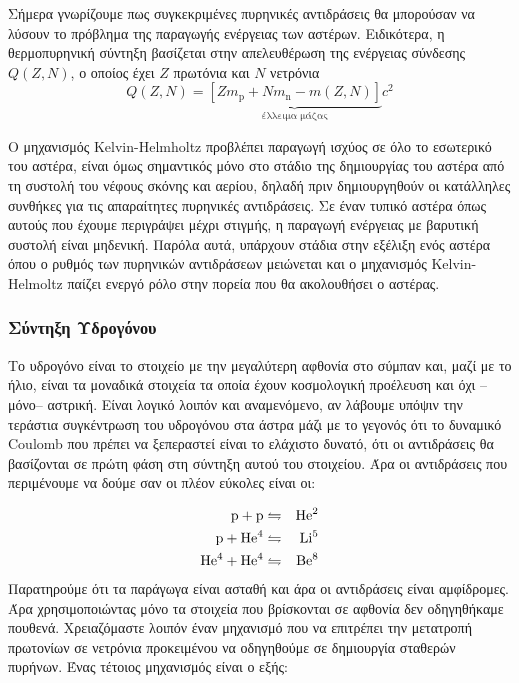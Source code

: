 Σήμερα γνωρίζουμε πως συγκεκριμένες πυρηνικές αντιδράσεις θα μπορούσαν να λύσουν το πρόβλημα της παραγωγής ενέργειας των αστέρων. Ειδικότερα, η θερμοπυρηνική σύντηξη βασίζεται στην απελευθέρωση της ενέργειας σύνδεσης $Q(Z, N)$, ο οποίος έχει $Z$ πρωτόνια και $N$ νετρόνια
\begin{equation}
    \label{eq:binding_energy}
    Q(Z,N) = \underbrace{\left[ Z m_{\text{p}} + N m_{\text{n}} - m(Z,N) \right]}_{\text{έλλειμα μάζας}}c^2
\end{equation}

Ο μηχανισμός Kelvin-Helmholtz προβλέπει παραγωγή ισχύος σε όλο το εσωτερικό του αστέρα, είναι όμως σημαντικός μόνο στο στάδιο της δημιουργίας του αστέρα από τη συστολή του νέφους σκόνης και αερίου, δηλαδή πριν δημιουργηθούν οι κατάλληλες συνθήκες για τις απαραίτητες πυρηνικές αντιδράσεις. Σε έναν τυπικό αστέρα όπως αυτούς που έχουμε περιγράψει μέχρι στιγμής, η παραγωγή ενέργειας με βαρυτική συστολή είναι μηδενική. Παρόλα αυτά, υπάρχουν στάδια στην εξέλιξη ενός αστέρα όπου ο ρυθμός των πυρηνικών αντιδράσεων μειώνεται και ο μηχανισμός Kelvin-Helmoltz παίζει ενεργό ρόλο στην πορεία που θα ακολουθήσει ο αστέρας.
\subsubsection{Σύντηξη Υδρογόνου}
Το υδρογόνο είναι το στοιχείο με την μεγαλύτερη αφθονία στο σύμπαν και, μαζί με το ήλιο, είναι τα μοναδικά στοιχεία τα οποία έχουν κοσμολογική προέλευση και όχι --μόνο-- αστρική. Είναι λογικό λοιπόν και αναμενόμενο, αν λάβουμε υπόψιν την τεράστια συγκέντρωση του υδρογόνου στα άστρα μάζι με το γεγονός ότι το δυναμικό Coulomb που πρέπει να ξεπεραστεί είναι το ελάχιστο δυνατό, ότι οι αντιδράσεις θα βασίζονται σε πρώτη φάση στη σύντηξη αυτού του στοιχείου. Άρα οι αντιδράσεις που περιμένουμε να δούμε σαν οι πλέον εύκολες είναι οι:

\begin{eqnarray} \rm
p + p & \leftrightharpoons & \rm He^2 \label{eq:p+p_he2} \\ 
\rm p + He^4 & \leftrightharpoons &  \rm Li^5 \label{eq:p+he_li5} \\
\rm He^4 + He^4 & \leftrightharpoons & \rm Be^8 \label{eq:he4+he4_be8_1}
\end{eqnarray}
Παρατηρούμε ότι τα παράγωγα είναι ασταθή και άρα οι αντιδράσεις είναι αμφίδρομες. Άρα χρησιμοποιώντας μόνο τα στοιχεία που βρίσκονται σε αφθονία δεν οδηγηθήκαμε πουθενά. Χρειαζόμαστε λοιπόν έναν μηχανισμό που να επιτρέπει την μετατροπή πρωτονίων σε νετρόνια προκειμένου να οδηγηθούμε σε δημιουργία σταθερών πυρήνων. Ένας τέτοιος μηχανισμός είναι ο εξής:

